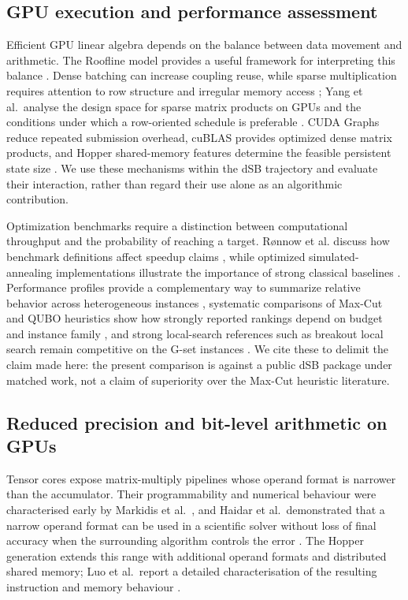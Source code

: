 \documentclass[11pt,a4paper]{article}
\begin{document}
\subsection{GPU execution and performance assessment}
Efficient GPU linear algebra depends on the balance between data movement and arithmetic. The Roofline model provides a useful framework for interpreting this balance \cite{roofline}. Dense batching can increase coupling reuse, while sparse multiplication requires attention to row structure and irregular memory access \cite{bell2009}; Yang et al.\ analyse the design space for sparse matrix products on GPUs and the conditions under which a row-oriented schedule is preferable \cite{yang2018}. CUDA Graphs reduce repeated submission overhead, cuBLAS provides optimized dense matrix products, and Hopper shared-memory features determine the feasible persistent state size \cite{cuda,cublas,hopper}. We use these mechanisms within the dSB trajectory and evaluate their interaction, rather than regard their use alone as an algorithmic contribution.

Optimization benchmarks require a distinction between computational throughput and the probability of reaching a target. R\o nnow et al. discuss how benchmark definitions affect speedup claims \cite{ronnow}, while optimized simulated-annealing implementations illustrate the importance of strong classical baselines \cite{isakov2015}. Performance profiles provide a complementary way to summarize relative behavior across heterogeneous instances \cite{dolan2002}, systematic comparisons of Max-Cut and QUBO heuristics show how strongly reported rankings depend on budget and instance family \cite{dunning2018}, and strong local-search references such as breakout local search remain competitive on the G-set instances \cite{benlic2013}. We cite these to delimit the claim made here: the present comparison is against a public dSB package under matched work, not a claim of superiority over the Max-Cut heuristic literature.

\subsection{Reduced precision and bit-level arithmetic on GPUs}
Tensor cores expose matrix-multiply pipelines whose operand format is narrower than the accumulator. Their programmability and numerical behaviour were characterised early by Markidis et al.~\cite{markidis2018}, and Haidar et al.\ demonstrated that a narrow operand format can be used in a scientific solver without loss of final accuracy when the surrounding algorithm controls the error \cite{haidar2018}. The Hopper generation extends this range with additional operand formats and distributed shared memory; Luo et al.\ report a detailed characterisation of the resulting instruction and memory behaviour \cite{luo2024}.
\end{document}
